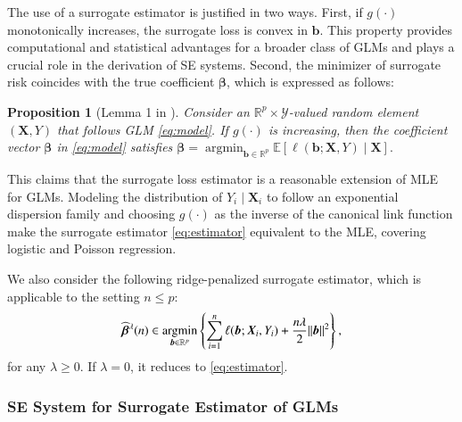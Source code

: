 \documentclass[12pt,reqno]{amsart}
\newtheorem{proposition}{Proposition}
\newcommand{\sbr}[1]{\left[#1\right]}
\newcommand{\cbr}[1]{\left\{#1\right\}}
\newcommand{\R}{\mathbb{R}}
\newcommand{\E}{\mathbb{E}}
\DeclareMathOperator*{\argmin}{arg min}
\newcommand{\ccc}{\color{black}}
\renewcommand{\hat}{\widehat}
\def\bb{\bm{b}}
\def\bX{\bm{X}}
\def\bbeta{\bm{\beta}}
\begin{document}
The use of a surrogate estimator is justified in two ways.
First, if $g(\cdot)$ monotonically increases, the surrogate loss is convex in $\bb$.
This property provides computational and statistical advantages for a broader class of GLMs and plays a crucial role in the derivation of SE systems.
Second, the minimizer of surrogate risk coincides with the true coefficient $\bbeta$, which is expressed as follows:
\begin{proposition}[Lemma 1 in \cite{agarwal2014least}]
\label{prop:agarwal}
Consider an $\mathbb{R}^p \times \mathcal{Y}$-valued random element $(\bX,Y)$ that follows GLM \eqref{eq:model}.
If $g(\cdot)$ is increasing, then the coefficient vector $\bbeta$ in \eqref{eq:model}  satisfies $\bbeta=\argmin_{\bb\in\R^p}\E\sbr{\ell(\bb;\bX,Y)\mid\bX}.$
\end{proposition}
This claims that the surrogate loss estimator is a reasonable extension of MLE for GLMs. 
Modeling the distribution of $Y_i \mid \bX_i$ to follow an exponential dispersion family \citep{jorgensen1987exponential} and choosing $g(\cdot)$ as the inverse of the canonical link function make the surrogate estimator \eqref{eq:estimator} equivalent to the MLE, covering logistic and Poisson regression. 

{\ccc
We also consider the following ridge-penalized surrogate estimator, which is applicable to the setting $n\le p$:
\begin{align}
\label{eq:estimator-ridge}
\hat{\bbeta}^\lambda(n)\in\argmin_{\bb\in\R^p}\cbr{\sum_{i=1}^n\ell(\bb;\bX_i,Y_i)+{\ccc\frac{n\lambda}{2}\|\bb\|^2 }},
\end{align}
for any $\lambda\ge0$.
If $\lambda=0$, it reduces to \eqref{eq:estimator}.
}


\subsubsection{SE System for Surrogate Estimator of GLMs}
\end{document}
